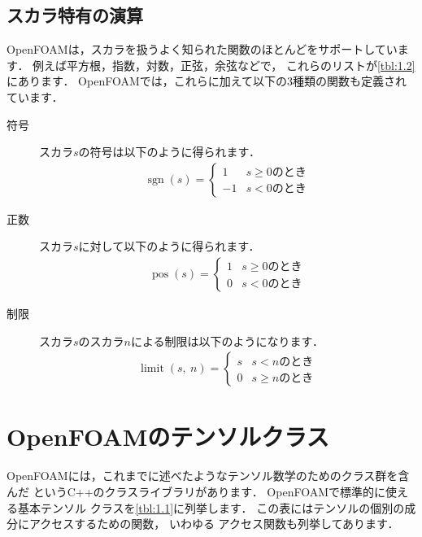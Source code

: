 \subsection{スカラ特有の演算}
\label{ssec:1.3.10}
OpenFOAMは，スカラを扱うよく知られた関数のほとんどをサポートしています．
例えば平方根，指数，対数，正弦，余弦などで，
これらのリストが\autoref{tbl:1.2}にあります．
OpenFOAMでは，これらに加えて以下の$3$種類の関数も定義されています．
\begin{description}
 \item[符号] スカラ$s$の符号は以下のように得られます．
            \begin{align}
             \label{eq:1.41}
             \mathop{\mathrm{sgn}}(s) =
             \begin{cases}
              1 & \text{$s \ge 0$のとき} \\
              -1 & \text{$s < 0$のとき}
             \end{cases}
            \end{align}
 \item[正数] スカラ$s$に対して以下のように得られます．
            \begin{align}
             \label{eq:1.42}
             \mathop{\mathrm{pos}}(s) =
             \begin{cases}
              1 & \text{$s \ge 0$のとき} \\
              0 & \text{$s < 0$のとき}
             \end{cases}
            \end{align}
 \item[制限] スカラ$s$のスカラ$n$による制限は以下のようになります．
            \begin{align}
             \label{eq:1.43}
             \mathop{\mathrm{limit}}(s,\ n) =
             \begin{cases}
              s & \text{$s < n$のとき} \\
              0 & \text{$s \ge n$のとき}
             \end{cases}
            \end{align}
\end{description}



\section{OpenFOAMのテンソルクラス}
\label{sec:1.4}
OpenFOAMには，これまでに述べたようなテンソル数学のためのクラス群を含んだ
%
%
というC++のクラスライブラリがあります．
OpenFOAMで標準的に使える基本テンソル
%
クラスを\autoref{tbl:1.1}に列挙します．
この表にはテンソルの個別の成分にアクセスするための関数，
いわゆる
%
アクセス関数も列挙してあります．

